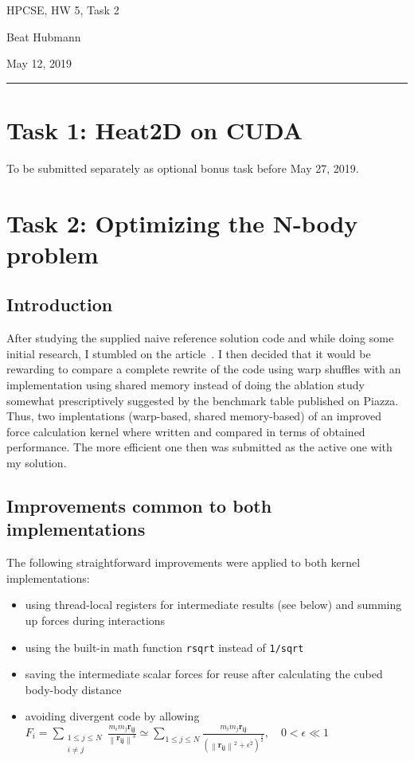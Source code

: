 \documentclass[11pt,a4paper]{article}
\begin{document}
\noindent\parbox{\linewidth}{
 \parbox{.25\linewidth}{\large HPCSE, HW 5, Task 2}\hfill
 \parbox{.5\linewidth}{\begin{center} \large Beat Hubmann \end{center}}\hfill
 \parbox{.2\linewidth}{\begin{flushright} \large May 12, 2019 \end{flushright}}
}
\noindent\rule{\linewidth}{2pt}

\section{Task 1: Heat2D on CUDA}
To be submitted separately as optional bonus task before May 27, 2019.

\section{Task 2: Optimizing the N-body problem}
\subsection{Introduction}
After studying the supplied naive reference solution code and while doing some initial research,
I stumbled on the article~\cite{shuffle}. I then decided that it would be rewarding
to compare a complete rewrite of the code using warp shuffles with an implementation using
shared memory instead of doing the ablation study somewhat prescriptively suggested by the
benchmark table published on Piazza.\\
Thus, two implentations (warp-based, shared memory-based) of an improved force calculation kernel where written and compared
in terms of obtained performance. The more efficient one then was submitted as the active one
with my solution.

\subsection{Improvements common to both implementations}
The following straightforward improvements were applied to both kernel implementations:
\begin{itemize}
	\item using thread-local registers for intermediate results (see below) and summing up forces during interactions
	\item using the built-in math function \texttt{rsqrt} instead of \texttt{1/sqrt}
	\item saving the intermediate scalar forces for reuse after calculating the cubed body-body distance
	\item avoiding divergent code by allowing 
	$F_i=\sum_{\substack{1\leq j \leq N\\i\neq j}}\frac{m_i m_j \mathbf{r_{ij}}}{\left\|\mathbf{r_{ij}}\right\|^3} \simeq \sum_{1\leq j \leq N}\frac{m_i m_j \mathbf{r_{ij}}}{(\left\|\mathbf{r_{ij}}\right\|^2+\epsilon^2)^{\frac{3}{2}}}, \quad 0 < \epsilon \ll 1 $
\end{itemize}
\end{document}
